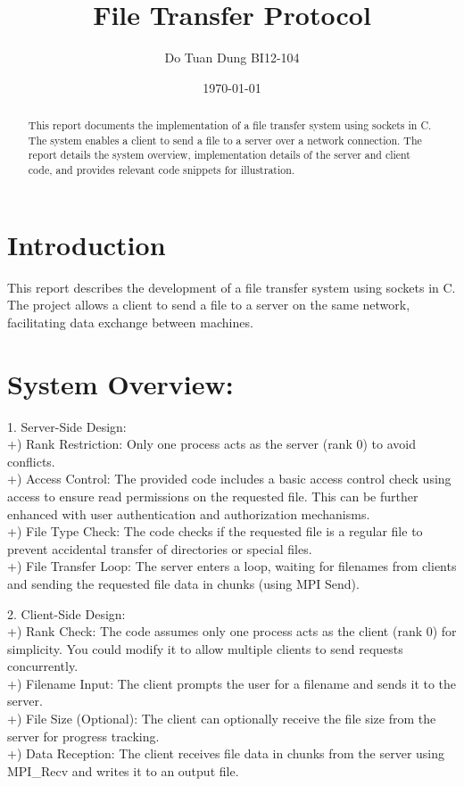 \documentclass{article}
\title{File Transfer Protocol}
\author{Do Tuan Dung BI12-104}
\date{\today}
\begin{document}
\maketitle

\begin{abstract}
This report documents the implementation of a file transfer system using sockets in C. The system enables a client to send a file to a server over a network connection. The report details the system overview, implementation details of the server and client code, and provides relevant code snippets for illustration.
\end{abstract}

\section{Introduction}

This report describes the development of a file transfer system using sockets in C. The project allows a client to send a file to a server on the same network, facilitating data exchange between machines.

\section{System Overview:}
1. Server-Side Design:
\\ +) Rank Restriction: Only one process acts as the server (rank 0) to avoid conflicts.
\\+) Access Control: The provided code includes a basic access control check using access to ensure read permissions on the requested file. This can be further enhanced with user authentication and authorization mechanisms.
\\ +) File Type Check: The code checks if the requested file is a regular file to prevent accidental transfer of directories or special files.
\\+) File Transfer Loop: The server enters a loop, waiting for filenames from clients and sending the requested file data in chunks (using MPI Send).

2. Client-Side Design:
\\+) Rank Check: The code assumes only one process acts as the client (rank 0) for simplicity. You could modify it to allow multiple clients to send requests concurrently.
\\+) Filename Input: The client prompts the user for a filename and sends it to the server.
\\+) File Size (Optional): The client can optionally receive the file size from the server for progress tracking.
\\+) Data Reception: The client receives file data in chunks from the server using MPI_Recv and writes it to an output file.
\end{document}
